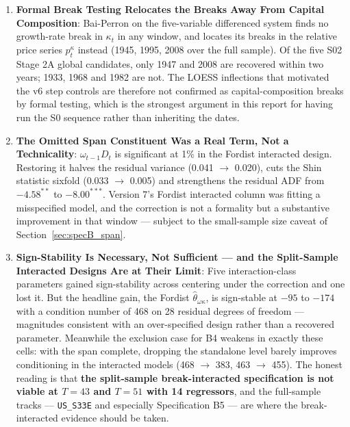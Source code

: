 \documentclass[11pt,a4paper]{article}
\begin{document}
\begin{enumerate}
    \item \textbf{Formal Break Testing Relocates the Breaks Away From Capital Composition}: Bai-Perron on the five-variable differenced system finds no growth-rate break in $\kappa_t$ in any window, and locates its breaks in the relative price series $p_t^{\kappa}$ instead (1945, 1995, 2008 over the full sample). Of the five S02 Stage 2A global candidates, only 1947 and 2008 are recovered within two years; 1933, 1968 and 1982 are not. The LOESS inflections that motivated the v6 step controls are therefore not confirmed as capital-composition breaks by formal testing, which is the strongest argument in this report for having run the S0\* sequence rather than inheriting the dates.
    \item \textbf{The Omitted Span Constituent Was a Real Term, Not a Technicality}: $\omega_{t-1}D_t$ is significant at 1\% in the Fordist interacted design. Restoring it halves the residual variance (0.041 $\to$ 0.020), cuts the Shin statistic sixfold (0.033 $\to$ 0.005) and strengthens the residual ADF from $-4.58^{**}$ to $-8.00^{***}$. Version 7's Fordist interacted column was fitting a misspecified model, and the correction is not a formality but a substantive improvement in that window --- subject to the small-sample size caveat of Section~\ref{sec:specB_span}.
    \item \textbf{Sign-Stability Is Necessary, Not Sufficient --- and the Split-Sample Interacted Designs Are at Their Limit}: Five interaction-class parameters gained sign-stability across centering under the correction and one lost it. But the headline gain, the Fordist $\hat{\theta}_{\omega\kappa}$, is sign-stable at $-95$ to $-174$ with a condition number of 468 on 28 residual degrees of freedom --- magnitudes consistent with an over-specified design rather than a recovered parameter. Meanwhile the exclusion case for B4 weakens in exactly these cells: with the span complete, dropping the standalone level barely improves conditioning in the interacted models (468 $\to$ 383, 463 $\to$ 455). The honest reading is that \textbf{the split-sample break-interacted specification is not viable at $T = 43$ and $T = 51$ with 14 regressors}, and the full-sample tracks --- \texttt{US\_S33E} and especially Specification B5 --- are where the break-interacted evidence should be taken.
\end{enumerate}
\end{document}
